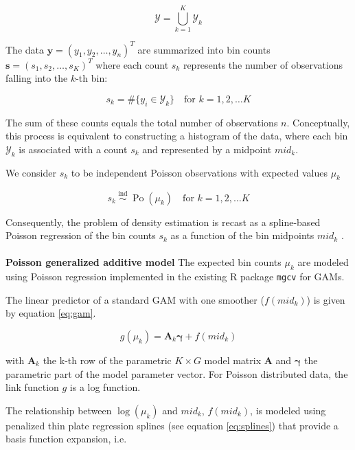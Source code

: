 \begin{equation}
	\mathscr{Y} =\bigcup_{k=1}^K \mathscr{Y}_k
	\label{eq:discr}
\end{equation}

The data $\boldsymbol{y} = (y_1, y_2, \ldots, y_n)^T$ are summarized into bin counts $\boldsymbol{s} = (s_1, s_2, \ldots, s_K)^T$ where each count $s_k$ represents the number of observations falling into the $k$-th bin:

\begin{equation}
    s_k = \# \{ y_i \in \mathscr{Y}_k \}\quad
    \text{for } k=1,2, \ldots K
	\label{eq:binning}
\end{equation}

The sum of these counts equals the total number of observations $n$. Conceptually, this process is equivalent to constructing a histogram of the data, where each bin $\mathscr{Y}_k$ is associated with a count $s_k$ and represented by a midpoint $mid_k$.

We consider $s_k$ to be independent Poisson observations with expected values $\mu_k$

\begin{equation}
    s_k \stackrel{\text { ind }}{\sim}
    \operatorname{Po}\left(\mu_k\right) \quad
    \text{for } k=1,2, \ldots K
    \label{eq:poisson}
\end{equation}

Consequently, the problem of density estimation is recast as a spline-based Poisson regression of the bin counts $s_k$ as a function of the bin midpoints $mid_k$ \cite{efron}.
\\
\\
\textbf{Poisson generalized additive model}
The expected bin counts $\mu_k$ are modeled using Poisson regression implemented in the existing R package \texttt{mgcv} \cite{mgcv} for GAMs.

The linear predictor of a standard GAM with one smoother ($f(mid_k)$) is given by equation \ref{eq:gam}.

\begin{equation}
    g(\mu_k) = \boldsymbol{A}_k\boldsymbol{\gamma} + f(mid_k)
    \label{eq:gam}
\end{equation}

with $\boldsymbol{A}_k$ the k-th row of the parametric $K \times G$ model matrix $\boldsymbol{A}$ and $\boldsymbol{\gamma}$ the parametric part of the model parameter vector. For Poisson distributed data, the link function $g$ is a log function.

The relationship between $\log(\mu_k)$ and $mid_k$, $f(mid_k)$, is modeled using penalized thin plate regression splines (see equation \ref{eq:splines}) that provide a basis function expansion, i.e.

